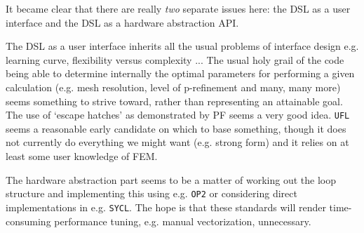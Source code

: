 \documentclass[11pt]{article}
\begin{document}
It became clear that there are really {\it two} separate issues here: the DSL 
as a user interface and the DSL as a hardware abstraction API.

The DSL as a user interface inherits all the usual problems of interface design 
e.g. learning curve, flexibility versus complexity ... The usual holy grail of 
the code being able to determine internally the optimal parameters for 
performing a given calculation (e.g. mesh resolution, level of p-refinement and 
many, many more) seems something to strive toward, rather than representing an 
attainable goal.  The use of `escape hatches' as demonstrated by PF seems a 
very good idea.  {\tt UFL} seems a reasonable early candidate on which to base 
something, though it does not currently do everything we might want (e.g. 
strong form) and it relies on at least some user knowledge of FEM.

The hardware abstraction part seems to be a matter of working out the loop 
structure and implementing this using e.g. {\tt OP2} or considering direct 
implementations in e.g. {\tt SYCL}.  The hope is that these standards will 
render time-consuming performance tuning, e.g. manual vectorization, 
unnecessary.
\end{document}
